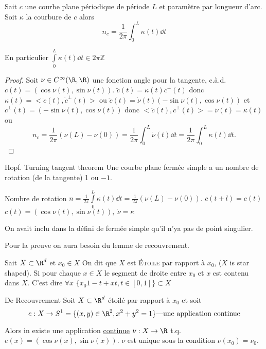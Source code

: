 		\begin{theorem}
			Sait $c$ une courbe plane périodique de période $L$ et paramètre par longueur d'arc. Soit $\kappa$ la courbure de $c$ alors
			$$n_c=\frac{1}{2\pi}\int_0^L\kappa(t)\dd{t}$$
		\end{theorem}
		
		\begin{remark}
			En particulier $\int\limits_0^L\kappa(t)\dd{t}\in 2\pi\mathbb{Z}$
		\end{remark}
		\begin{proof}
			Soit $\nu\in C^\infty(\R, \R)$ une fonction angle pour la tangente, c.à.d.$\dot{c}(t)=(\cos \nu(t), \sin\nu(t))$. $\ddot{c}(t)=\kappa(t)\dot{c}^\perp (t)$ donc $\kappa(t)=<\ddot{c}(t), \dot{c}^\perp (t)>$ ou $\ddot{c}(t)=\dot{\nu}(t)(-\sin\nu(t), \cos\nu(t))$ et $\dot{c}^\perp(t)=(-\sin\nu(t),\cos\nu(t))$
			donc $<\ddot{c}(t), \dot{c}^\perp(t)>=\dot{\nu}(t)=\kappa(t)$ ou
			$$n_c = \frac{1}{2\pi}(\nu(L)-\nu(0))=\frac{1}{2\pi}\int_0^L \dot{\nu}(t)\dd{t}=\frac{1}{2\pi}\int_0^L\kappa(t)\dd{t}.$$
		\end{proof}

		\begin{theorem}{Hopf. Turning tangent theorem}
			Une courbe plane fermée simple a un nombre de rotation (de la tangente) 1 ou $-1$.
		\end{theorem}

		Nombre de rotation $n=\frac{1}{2\pi}\int\limits_0^L\kappa(t)\dd{t}=\frac{1}{2\pi}(\nu(L)-\nu(0))$. $c(t+l)=c(t)$ $c(t)=(\cos \nu (t), \sin \nu(t)),\ \dot\nu=\kappa$
		\begin{remark}
			On avait inclu dans la défini de fermée simple qu'il n'ya pas de point singulier.
		\end{remark}
	
		Pour la preuve on aura besoin du lemme de recouvrement.

		\begin{definition}
			Sait $X\subset \R^d$ et $x_0\in X$ On dit que $X$ est \textsc{Étoile} par rapport à $x_0$, ($X$ is star shaped). Si pour chaque $x\in X$ le segment de droite entre $x_0$ et $x$ est contenu dans $X$. C'est dire $\forall x$ $\{x_0{1-t}+xt, t\in[0,1]\}\subset X$
		\end{definition}

		\begin{lemme}{De Recouvrement}
			Soit $X\subset \R^d$ étoilé par rapport à $x_0$ et soit
			$$e: X\rightarrow S^1=\{(x,y)\in\R^2, x^2+y^2=1\} \text{---une application continue}$$
	
			Alors in existe une application \underline{continue} $\nu: X\rightarrow \R$ t.q. $e(x)=(\cos\nu(x), \sin\nu(x))$. $\nu$ est unique sous la condition $\nu(x_0)=\nu_0$.
		\end{lemme}

